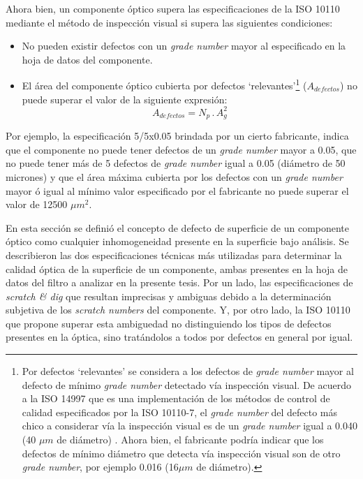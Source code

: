 Ahora bien, un componente óptico supera las especificaciones de la ISO 10110 mediante el método de inspección visual si supera las siguientes condiciones:
\begin{itemize}
\item No pueden existir defectos con un \textit{grade number} mayor al especificado en la hoja de datos del componente.
\item El área del componente óptico cubierta por defectos `relevantes'\footnote{Por defectos `relevantes' se considera a los defectos de \textit{grade number} mayor al defecto de mínimo \textit{grade number} detectado vía inspección visual. De acuerdo a la ISO 14997 que es una implementación de los métodos de control de calidad especificados por la ISO 10110-7, el \textit{grade number} del defecto más chico a considerar vía la inspección visual es de un \textit{grade number} igual a 0.040 (40 $\mu m$ de diámetro) \cite{etsol}. Ahora bien, el fabricante podría indicar que los defectos de mínimo diámetro que detecta vía inspección visual son de otro \textit{grade number}, por ejemplo 0.016 (16$\mu m$ de diámetro).} ($A_{defectos}$) no puede superar el valor de la siguiente expresión:
\begin{equation}
A_{defectos} = N_{p}\hspace{2pt} .\hspace{2pt} A_{g}^{2}
\label{eq:isoarea}
\end{equation}
\end{itemize}
\hspace{0.5cm}Por ejemplo, la especificación 5/5x0.05 brindada por un cierto fabricante, indica que el componente no puede tener defectos de un \textit{grade number} mayor a 0.05, que no puede tener más de 5 defectos de \textit{grade number} igual a 0.05 (diámetro de 50 micrones) y que el área máxima cubierta por los defectos con un \textit{grade number} mayor ó igual al mínimo valor especificado por el fabricante no puede superar el valor de 12500 $\mu m^{2}$.

 En esta sección se definió el concepto de defecto de superficie de un componente óptico como cualquier inhomogeneidad presente en la superficie bajo análisis. Se describieron las dos especificaciones técnicas más utilizadas para determinar la calidad óptica de la superficie de un componente, ambas presentes en la hoja de datos del filtro a analizar en la presente tesis. Por un lado, las especificaciones de \textit{scratch \& dig} que resultan imprecisas y ambiguas debido a la determinación subjetiva de los \textit{scratch numbers} del componente. Y, por otro lado, la ISO 10110 que propone superar esta ambiguedad no distinguiendo los tipos de defectos presentes en la óptica, sino tratándolos a todos por defectos en general por igual.
  
